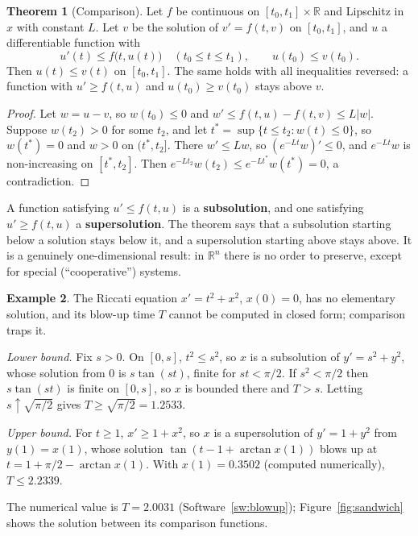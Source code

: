 \documentclass[11pt,a4paper]{article}
\numberwithin{equation}{section}
\theoremstyle{definition}
\newtheorem{thm}{Theorem}[subsection]
\newtheorem{exa}[thm]{Example}
\begin{document}
\begin{thm}[Comparison]
\label{thm:comparison}
Let $f$ be continuous on $[t_0, t_1] \times \mathbb R$ and Lipschitz in $x$ with constant $L$. Let $v$ be the solution of $v' = f(t, v)$ on $[t_0, t_1]$, and $u$ a differentiable function with
\[
u'(t) \leq f\bigl(t, u(t)\bigr) \quad (t_0 \leq t \leq t_1), \qquad u(t_0) \leq v(t_0) .
\]
Then $u(t) \leq v(t)$ on $[t_0, t_1]$. The same holds with all inequalities reversed: a function with $u' \geq f(t, u)$ and $u(t_0) \geq v(t_0)$ stays above $v$.
\end{thm}

\begin{proof}
Let $w = u - v$, so $w(t_0) \leq 0$ and $w' \leq f(t, u) - f(t, v) \leq L|w|$. Suppose $w(t_2) > 0$ for some $t_2$, and let $t^* = \sup\{t \leq t_2 : w(t) \leq 0\}$, so $w(t^*) = 0$ and $w > 0$ on $(t^*, t_2]$. There
$w' \leq Lw$, so $(e^{-Lt}w)' \leq 0$, and $e^{-Lt}w$ is non-increasing on $[t^*, t_2]$. Then $e^{-Lt_2}w(t_2) \leq e^{-Lt^*}w(t^*) = 0$, a contradiction.
\end{proof}

A function satisfying $u' \leq f(t, u)$ is a \textbf{subsolution}, and one satisfying $u' \geq f(t, u)$ a \textbf{supersolution}. The theorem says that a subsolution starting below a
solution stays below it, and a supersolution starting above stays above. It is a genuinely one-dimensional result: in $\mathbb R^n$ there is no order to preserve, except
for special (``cooperative'') systems.

\begin{exa}
\label{ex:ricblow}
The Riccati equation $x' = t^2 + x^2$, $x(0) = 0$, has no elementary solution, and its blow-up time $T$ cannot be computed in closed form; comparison traps it.

\emph{Lower bound.} Fix $s > 0$. On $[0, s]$, $t^2 \leq s^2$, so $x$ is a subsolution of $y' = s^2 + y^2$, whose solution from $0$ is $s\tan(st)$, finite for $st < \pi/2$. If $s^2 < \pi/2$ then $s\tan(st)$ is
finite on $[0, s]$, so $x$ is bounded there and $T > s$. Letting $s \uparrow \sqrt{\pi/2}$ gives $T \geq \sqrt{\pi/2} = 1.2533$.

\emph{Upper bound.} For $t \geq 1$, $x' \geq 1 + x^2$, so $x$ is a supersolution of $y' = 1 + y^2$ from $y(1) = x(1)$, whose solution $\tan(t - 1 + \arctan x(1))$ blows up at $t = 1 + \pi/2 - \arctan x(1)$. With
$x(1) = 0.3502$ (computed numerically), $T \leq 2.2339$.

The numerical value is $T = 2.0031$ (Software~\ref{sw:blowup}); Figure~\ref{fig:sandwich} shows the solution between its comparison functions.
\end{exa}
\end{document}
